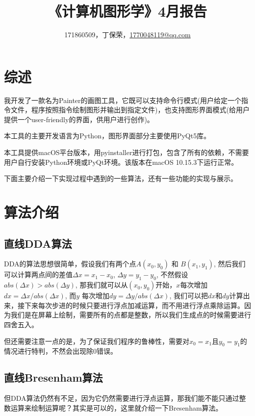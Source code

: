 \documentclass[a4paper,UTF8]{article}
\theoremstyle{definition}
\begin{document}
\title{\textbf{《计算机图形学》4月报告}}
\author{171860509，丁保荣，\href{mailto:1770048119@qq.com}{1770048119@qq.com}}
\maketitle

\tableofcontents

\newpage

\section{综述}
我开发了一款名为Painter的画图工具，它既可以支持命令行模式(用户给定一个指令文件，程序按照指令绘制图形并输出到指定文件)，也支持图形界面模式(给用户提供一个user-friendly的界面，供用户进行创作)。

本工具的主要开发语言为Python，图形界面部分主要使用PyQt5库。

本工具提供macOS平台版本，用pyinstaller进行打包，包含了所有的依赖，不需要用户自行安装Python环境或PyQt环境。该版本在macOS 10.15.3下运行正常。

下面主要介绍一下实现过程中遇到的一些算法，还有一些功能的实现与展示。


\section{算法介绍}

\subsection{直线DDA算法}
DDA的算法思想很简单，假设我们有两个点$A(x_0, y_0)$ 和 $B(x_1, y_1)$, 然后我们可以计算两点间的差值$\Delta x  = x_1 - x_0$, $\Delta y = y_1 - y_0$, 不然假设 $abs(\Delta x) > abs(\Delta y)$, 那我们就可以从$(x_0, y_0)$开始，$x$每次增加$dx = \Delta x / abs(\Delta x)$, 而$y$ 每次增加$dy = \Delta y / abs(\Delta x)$, 我们可以把$dx$和$dy$计算出来，接下来每次步进的时候只要进行浮点加减运算，而不用进行浮点乘除运算。因为我们是在屏幕上绘制，需要所有的点都是整数，所以我们生成点的时候需要进行四舍五入。

但还需要注意一点的是，为了保证我们程序的鲁棒性，需要对$x_0 = x_1$且$y_0 = y_1$的情况进行特判，不然会出现除0错误。


\subsection{直线Bresenham算法}
但DDA算法仍然有不足，因为它仍然需要进行浮点运算，那我们能不能只通过整数运算来绘制运算呢？其实是可以的，这里就介绍一下Bresenham算法\cite{wiki:Bresenham's_line_algorithm}。
\end{document}
